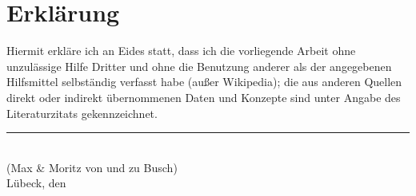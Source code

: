 
\cleardoublepage
\thispagestyle{plain}
\vspace*{\fill}

\section*{Erklärung}

Hiermit erkläre ich an Eides statt, dass ich die vorliegende
Arbeit ohne unzulässige Hilfe Dritter und ohne die Benutzung anderer
als der angegebenen Hilfsmittel selbständig verfasst habe (außer Wikipedia);
die aus anderen Quellen direkt oder indirekt übernommenen Daten und Konzepte
sind unter Angabe des Literaturzitats gekennzeichnet.

\vskip2cm

\rule{5cm}{0.4pt}\\
(Max \& Moritz von und zu Busch)\\
Lübeck, den \duedate